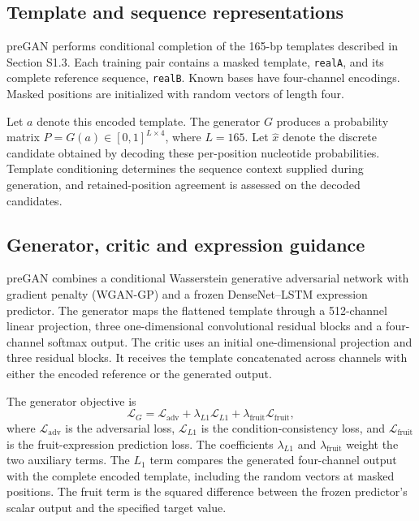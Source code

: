 \documentclass[10pt]{article}
\begin{document}
\subsection{Template and sequence representations}

preGAN performs conditional completion of the 165-bp templates described in Section S1.3. Each training pair contains a masked template, \texttt{realA}, and its complete reference sequence, \texttt{realB}. Known bases have four-channel encodings. Masked positions are initialized with random vectors of length four.

Let $a$ denote this encoded template. The generator $G$ produces a probability matrix $P=G(a)\in[0,1]^{L\times4}$, where $L=165$. Let $\hat{x}$ denote the discrete candidate obtained by decoding these per-position nucleotide probabilities. Template conditioning determines the sequence context supplied during generation, and retained-position agreement is assessed on the decoded candidates.

\subsection{Generator, critic and expression guidance}

preGAN combines a conditional Wasserstein generative adversarial network with gradient penalty (WGAN-GP) and a frozen DenseNet--LSTM expression predictor. The generator maps the flattened template through a 512-channel linear projection, three one-dimensional convolutional residual blocks and a four-channel softmax output. The critic uses an initial one-dimensional projection and three residual blocks. It receives the template concatenated across channels with either the encoded reference or the generated output.

The generator objective is
\[
\mathcal{L}_{G}=\mathcal{L}_{\mathrm{adv}}
+\lambda_{L1}\mathcal{L}_{L1}
+\lambda_{\mathrm{fruit}}\mathcal{L}_{\mathrm{fruit}},
\]
where $\mathcal{L}_{\mathrm{adv}}$ is the adversarial loss, $\mathcal{L}_{L1}$ is the condition-consistency loss, and $\mathcal{L}_{\mathrm{fruit}}$ is the fruit-expression prediction loss. The coefficients $\lambda_{L1}$ and $\lambda_{\mathrm{fruit}}$ weight the two auxiliary terms. The $L_1$ term compares the generated four-channel output with the complete encoded template, including the random vectors at masked positions. The fruit term is the squared difference between the frozen predictor's scalar output and the specified target value.
\end{document}
